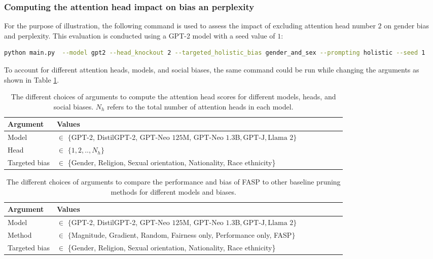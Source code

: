 \documentclass[letterpaper]{article} %
\begin{document}
\subsubsection{Computing the attention head impact on bias an perplexity}\label{sec:compute_scores}
For the purpose of illustration, the following command is used to assess the impact of excluding attention head number $2$ on gender bias and perplexity. This evaluation is conducted using a GPT-2 model with a seed value of $1$:
 \begin{lstlisting}[language=bash,numbers=none]
python main.py  --model gpt2 --head_knockout 2 --targeted_holistic_bias gender_and_sex --prompting holistic --seed 1 
\end{lstlisting}
To account for different attention heads, models, and social biases, the same command could be run while changing the arguments as shown in Table \ref{tab:computing_the_score}.


\begin{table}[h!] 
\centering
\begin{tabular}{llllllll}
\hline
\textbf{Argument} & \textbf{Values}\\
\hline
\centering
Model                                       & $\in$ $\{$\textrm{GPT-2}, \textrm{DistilGPT-2}, GPT-Neo $125$M, GPT-Neo $1.3$B$,\textrm{GPT-J},\textrm{Llama $2$}\}$      \\ 
Head                                         & $\in$ $\{1, 2, .., N_h\}$  \\ 
Targeted bias&  $\in$ \{Gender, Religion, Sexual orientation, Nationality, Race ethnicity\}  \\ 
\hline
\end{tabular}
\caption{The different choices of arguments to compute the attention head scores for different models, heads, and social biases. $N_h$ refers to the total number of attention heads in each model.
}
\label{tab:computing_the_score}
\end{table}

\begin{table}[h!] 
\centering
\begin{tabular}{llllllll}
\hline
\textbf{Argument} & \textbf{Values}\\
\hline
\centering

Model                                       & $\in$ $\{$\textrm{GPT-2}, \textrm{DistilGPT-2}, GPT-Neo $125$M, GPT-Neo $1.3$B$,\textrm{GPT-J},\textrm{Llama $2$}\}$      \\ 
Method                                         & $\in$ $\{$Magnitude, Gradient, Random, Fairness only, Performance only, FASP$\}$  \\ 
Targeted bias&  $\in$ \{Gender, Religion, Sexual orientation, Nationality, Race ethnicity\}  \\ 
\hline
\end{tabular}
\caption{The different choices of arguments to compare the performance and bias of FASP to other baseline pruning methods for different models and biases.
}
\label{tab:baselines}
\end{table}
\end{document}
